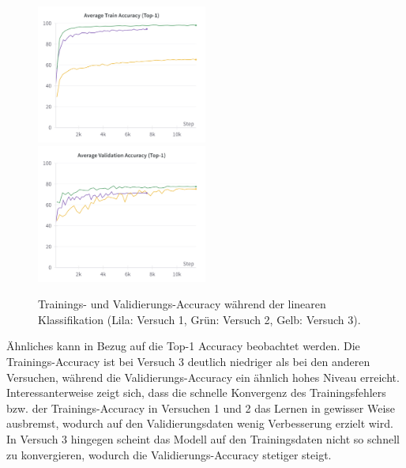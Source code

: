 \begin{figure}[h]
	\centering
	\includegraphics[width=0.5\textwidth]{images/figure_results_supcon-lin_avg-train-acc.png}%
	\includegraphics[width=0.5\textwidth]{images/figure_results_supcon-lin_avg-val-acc.png}
	\caption[Trainings- und Validierungs-Accuracy während der linearen Klassifikation.]{Trainings- und Validierungs-Accuracy während der linearen Klassifikation (\textcolor{exp1}{Lila}: Versuch 1, \textcolor{exp2}{Grün}: Versuch 2, \textcolor{exp3}{Gelb}: Versuch 3).}
	\label{fig:supcon-lin-acc}
\end{figure}

Ähnliches kann in Bezug auf die Top-1 Accuracy beobachtet werden. Die Trainings-Accuracy ist bei Versuch 3 deutlich niedriger als bei den anderen Versuchen, während die Validierungs-Accuracy ein ähnlich hohes Niveau erreicht. Interessanterweise zeigt sich, dass die schnelle Konvergenz des Trainingsfehlers bzw. der Trainings-Accuracy in Versuchen 1 und 2 das Lernen in gewisser Weise ausbremst, wodurch auf den Validierungsdaten wenig Verbesserung erzielt wird. In Versuch 3 hingegen scheint das Modell auf den Trainingsdaten nicht so schnell zu konvergieren, wodurch die Validierungs-Accuracy stetiger steigt.

